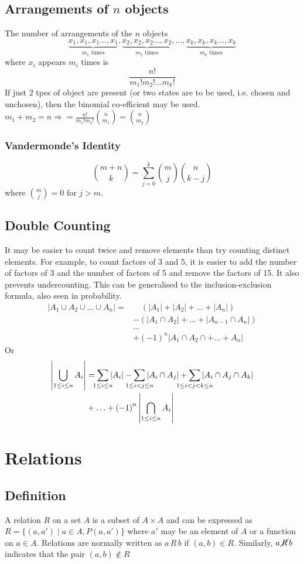 \documentclass[10pt]{article}
\begin{document}
\subsection{Arrangements of $n$ objects}
The number of arrangements of the $n$ objects \[\underbrace{x_1,x_1,x_1\ldots ,x_1}_\text{$m_1$ times},\underbrace{x_2,x_2,x_2\ldots ,x_2}_\text{$m_2$ times},\ldots,\underbrace{x_k,x_k,x_k\ldots,x_k}_\text{$m_k$ times}\] where $x_i$ appears $m_i$ times is 
\[
\frac{n!}{m_1!m_2!\ldots m_k!}
\]
If just 2 tpes of object are present (or two states are to be used, i.e. chosen and unchosen), then the binomial co-efficient may be used.  $m_1+m_2=n\Rightarrow=\frac{n!}{m_1!m_2!}\binom{n}{m_1}=\binom{n}{m_2}$
\subsubsection{Vandermonde's Identity}
\[
\binom{m+n}{k}=\sum^k_{j=0}\binom{m}{j}\binom{n}{k-j}
\]
where $\binom{m}{j}=0\text{ for }j>m$.
\subsection{Double Counting}
It may be easier to count twice and remove elements than try counting distinct elements.  For example, to count factors of 3 and 5, it is easier to add the number of factors of 3 and the number of factors of 5 and remove the factors of 15.  It also prevents undercounting.  This can be generalised to the inclusion-exclusion formula, also seen in probability.
\begin{align*}
\left|A_1\cup A_2\cup\ldots\cup A_n\right|=&\quad\left(|A_1|+|A_2|+\ldots+|A_n|\right)\\
&-\left(|A_1\cap A_2|+\ldots+|A_{n-1}\cap A_n|\right)\\
&\ldots\\
&+(-1)^n|A_1\cap A_2\cap+\ldots+A_n|
\end{align*}
Or
\begin{align*}
\left|\bigcup_{{1\le i\le n}} A_i\right|&=\sum_{\mathclap{1\le i\le n}}\left| A_i\right|-\sum_{\mathclap{1\le i< j\le n}}\left|A_i\cap A_j\right|
+\sum_{\mathclap{1\le i < j < k \le n}}\left|A_i\cap A_j\cap A_k\right|\\&+\ldots+\left(-1\right)^n\left|\bigcap_{{1\le i\le n}}A_i\right|
\end{align*}
\section{Relations}
\subsection{Definition}
A relation $R$ on a set $A$ is a subset of $A\times A$ and can be expressed as $R=\{(a,a')\mid a\in A, P(a,a')\}$ where $a'$ may be an element of $A$ or a function on $a\in A$.  Relations are normally written as $a\, R\, b$ if $(a,b)\in R$.  Similarly, $a\,\cancel{R}\, b$ indicates that the pair $(a,b)\not\in R$
\end{document}
